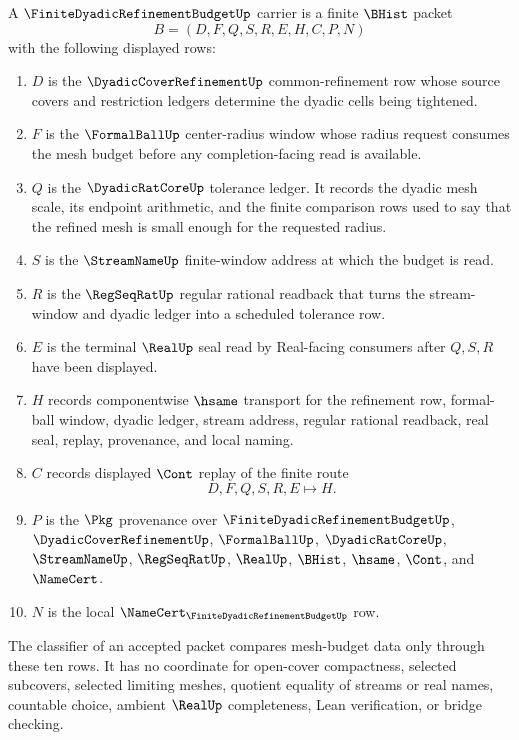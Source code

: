 \begin{definition}
\label{def:finite-dyadic-refinement-budget-carrier}
A $\FiniteDyadicRefinementBudgetUp$ carrier is a finite $\BHist$ packet
$$
B=(D,F,Q,S,R,E,H,C,P,N)
$$
with the following displayed rows:
\begin{enumerate}
\item $D$ is the $\DyadicCoverRefinementUp$ common-refinement row whose source covers and restriction ledgers determine the dyadic cells being tightened.
\item $F$ is the $\FormalBallUp$ center-radius window whose radius request consumes the mesh budget before any completion-facing read is available.
\item $Q$ is the $\DyadicRatCoreUp$ tolerance ledger. It records the dyadic mesh scale, its endpoint arithmetic, and the finite comparison rows used to say that the refined mesh is small enough for the requested radius.
\item $S$ is the $\StreamNameUp$ finite-window address at which the budget is read.
\item $R$ is the $\RegSeqRatUp$ regular rational readback that turns the stream-window and dyadic ledger into a scheduled tolerance row.
\item $E$ is the terminal $\RealUp$ seal read by Real-facing consumers after $Q,S,R$ have been displayed.
\item $H$ records componentwise $\hsame$ transport for the refinement row, formal-ball window, dyadic ledger, stream address, regular rational readback, real seal, replay, provenance, and local naming.
\item $C$ records displayed $\Cont$ replay of the finite route
$$
D,F,Q,S,R,E \longmapsto H .
$$
\item $P$ is the $\Pkg$ provenance over $\FiniteDyadicRefinementBudgetUp$, $\DyadicCoverRefinementUp$, $\FormalBallUp$, $\DyadicRatCoreUp$, $\StreamNameUp$, $\RegSeqRatUp$, $\RealUp$, $\BHist$, $\hsame$, $\Cont$, and $\NameCert$.
\item $N$ is the local $\NameCert_{\FiniteDyadicRefinementBudgetUp}$ row.
\end{enumerate}
The classifier of an accepted packet compares mesh-budget data only through these ten rows. It has no coordinate for open-cover compactness, selected subcovers, selected limiting meshes, quotient equality of streams or real names, countable choice, ambient $\RealUp$ completeness, Lean verification, or bridge checking.
\end{definition}

